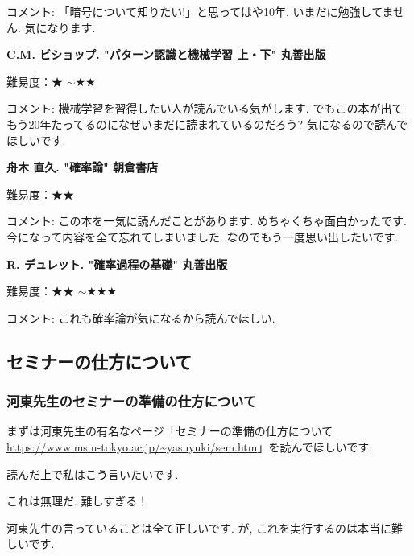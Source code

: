 コメント: 「暗号について知りたい!」と思ってはや10年. いまだに勉強してません. 気になります. 
\vspace{8pt}


\textbf{C.M. ビショップ. "パターン認識と機械学習 上・下" 丸善出版}  　\vspace{-6pt} 

難易度：★ $\sim$★★\vspace{-6pt} 

コメント: 機械学習を習得したい人が読んでいる気がします. でもこの本が出てもう20年たってるのになぜいまだに読まれているのだろう? 気になるので読んでほしいです. 
\vspace{8pt}

\textbf{舟木 直久. "確率論" 朝倉書店}  　\vspace{-6pt} 

難易度：★★\vspace{-6pt} 

コメント: この本を一気に読んだことがあります. めちゃくちゃ面白かったです. 今になって内容を全て忘れてしまいました. なのでもう一度思い出したいです. 

\textbf{R. デュレット. "確率過程の基礎" 丸善出版}  　\vspace{-6pt} 

難易度：★★ $\sim$★★★\vspace{-6pt} 

コメント: これも確率論が気になるから読んでほしい. 

\vspace{8pt}


\subsection{セミナーの仕方について}
\label{subsec-seminar}
\subsubsection{河東先生のセミナーの準備の仕方について}
まずは河東先生の有名なページ「セミナーの準備の仕方について \url{https://www.ms.u-tokyo.ac.jp/~yasuyuki/sem.htm}」を読んでほしいです.

読んだ上で私はこう言いたいです. 
\begin{tcolorbox}[mybox]
\begin{center}
これは無理だ. 難しすぎる！
\end{center}
\end{tcolorbox}
河東先生の言っていることは全て正しいです. 
が, これを実行するのは本当に難しいです. 

